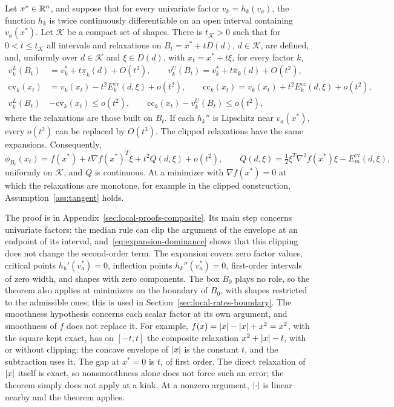 \begin{theorem}\label{thm:composite-expansion}
Let $x^*\in\mathbb{R}^n$, and suppose that for every univariate factor
$v_k=h_k(v_a)$, the function $h_k$ is twice continuously differentiable on
an open interval containing $v_a(x^*)$. Let $\mathcal K$ be a compact set of
shapes. There is $t_{\mathcal K}>0$ such that for $0<t\le t_{\mathcal K}$ all
intervals and relaxations on $B_t=x^*+tD(d)$, $d\in\mathcal K$, are defined,
and, uniformly over $d\in\mathcal K$ and $\xi\in D(d)$, with $x_t=x^*+t\xi$,
for every factor $k$,
\begin{align}
  v_k^L(B_t)&=v_k^*+t\underline\pi_k(d)+O(t^2),\qquad
  v_k^U(B_t)=v_k^*+t\overline\pi_k(d)+O(t^2),\label{eq:expansion-interval}\\
  \mathrm{cv}_k(x_t)&=v_k(x_t)-t^2E_k^{\mathrm{cv}}(d,\xi)+o(t^2),\qquad
  \mathrm{cc}_k(x_t)=v_k(x_t)+t^2E_k^{\mathrm{cc}}(d,\xi)+o(t^2),\label{eq:expansion-relaxation}\\
  v_k^L(B_t)&-\mathrm{cv}_k(x_t)\le o(t^2),\qquad
  \mathrm{cc}_k(x_t)-v_k^U(B_t)\le o(t^2),\label{eq:expansion-dominance}
\end{align}
where the relaxations are those built on $B_t$. If each $h_k''$ is
Lipschitz near $v_a(x^*)$, every $o(t^2)$ can be replaced by $O(t^3)$. The
clipped relaxations have the same expansions. Consequently,
\[
  \phi_{B_t}(x_t)=f(x^*)+t\nabla f(x^*)^T\xi+t^2Q(d,\xi)+o(t^2),\qquad
  Q(d,\xi)=\tfrac12\xi^T\nabla^2f(x^*)\xi-E_m^{\mathrm{cv}}(d,\xi),
\]
uniformly on $\mathcal K$, and $Q$ is continuous. At a minimizer with
$\nabla f(x^*)=0$ at which the relaxations are monotone, for example in
the clipped construction, Assumption~\ref{ass:tangent} holds.
\end{theorem}

The proof is in Appendix~\ref{sec:local-proofs-composite}. Its main step
concerns univariate factors: the median rule can clip the argument of the
envelope at an endpoint of its interval, and~\eqref{eq:expansion-dominance}
shows that this clipping does not change the second-order term. The
expansion covers zero factor values, critical points $h_k'(v_a^*)=0$,
inflection points $h_k''(v_a^*)=0$, first-order intervals of zero width,
and shapes with zero components. The box $B_0$ plays no role, so the
theorem also applies at minimizers on the boundary of $B_0$, with shapes
restricted to the admissible ones; this is used in
Section~\ref{sec:local-rates-boundary}. The smoothness hypothesis concerns
each scalar factor at its own argument, and smoothness of $f$ does not
replace it. For example, $f(x)=\lvert x\rvert-\lvert x\rvert+x^2=x^2$, with the square kept
exact, has on $[-t,t]$ the composite relaxation $x^2+\lvert x\rvert-t$, with or
without clipping: the concave envelope of $\lvert x\rvert$ is the constant $t$, and
the subtraction uses it. The gap at $x^*=0$ is $t$, of first order. The
direct relaxation of $\lvert x\rvert$ itself is exact, so nonsmoothness alone does
not force such an error; the theorem simply does not apply at a kink. At a
nonzero argument, $\lvert \cdot\rvert$ is linear nearby and the theorem applies.

